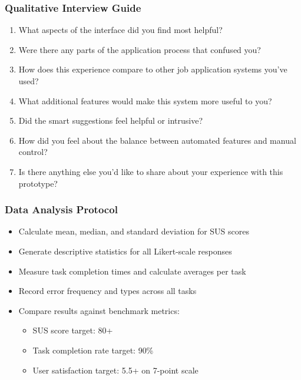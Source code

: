 \documentclass[
	letterpaper, %
]{jdf}
\begin{document}
\begin{sloppypar}
\subsubsection*{Qualitative Interview Guide}

\begin{enumerate}
    \item What aspects of the interface did you find most helpful?
    \item Were there any parts of the application process that confused you?
    \item How does this experience compare to other job application systems you've used?
    \item What additional features would make this system more useful to you?
    \item Did the smart suggestions feel helpful or intrusive?
    \item How did you feel about the balance between automated features and manual control?
    \item Is there anything else you'd like to share about your experience with this prototype?
\end{enumerate}

\subsubsection*{Data Analysis Protocol}

\begin{itemize}
    \item Calculate mean, median, and standard deviation for SUS scores
    \item Generate descriptive statistics for all Likert-scale responses
    \item Measure task completion times and calculate averages per task
    \item Record error frequency and types across all tasks
    \item Compare results against benchmark metrics:
    \begin{itemize}
        \item SUS score target: 80+
        \item Task completion rate target: 90\%
        \item User satisfaction target: 5.5+ on 7-point scale
    \end{itemize}
\end{itemize}


\end{sloppypar}
\end{document}
